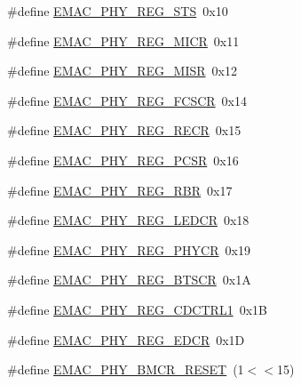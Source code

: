 \begin{DoxyCompactItemize}
\item 
\#define \hyperlink{group___e_m_a_c___private___macros_gab81231cf870148e245035dc9f08ce098}{\-E\-M\-A\-C\-\_\-\-P\-H\-Y\-\_\-\-R\-E\-G\-\_\-\-S\-T\-S}~0x10
\item 
\#define \hyperlink{group___e_m_a_c___private___macros_ga39798a05aaf30c16c250cf8f3f61a3f5}{\-E\-M\-A\-C\-\_\-\-P\-H\-Y\-\_\-\-R\-E\-G\-\_\-\-M\-I\-C\-R}~0x11
\item 
\#define \hyperlink{group___e_m_a_c___private___macros_ga61ebfc025c6ca103755e2a2ca122b3af}{\-E\-M\-A\-C\-\_\-\-P\-H\-Y\-\_\-\-R\-E\-G\-\_\-\-M\-I\-S\-R}~0x12
\item 
\#define \hyperlink{group___e_m_a_c___private___macros_gac8af2a4d386e783bab68d1c8d9c87a43}{\-E\-M\-A\-C\-\_\-\-P\-H\-Y\-\_\-\-R\-E\-G\-\_\-\-F\-C\-S\-C\-R}~0x14
\item 
\#define \hyperlink{group___e_m_a_c___private___macros_ga25d736480ebe9af3997bed2fd36e9f12}{\-E\-M\-A\-C\-\_\-\-P\-H\-Y\-\_\-\-R\-E\-G\-\_\-\-R\-E\-C\-R}~0x15
\item 
\#define \hyperlink{group___e_m_a_c___private___macros_ga4ed10e2f0eb8e71ae060fbd2d21fc312}{\-E\-M\-A\-C\-\_\-\-P\-H\-Y\-\_\-\-R\-E\-G\-\_\-\-P\-C\-S\-R}~0x16
\item 
\#define \hyperlink{group___e_m_a_c___private___macros_gac4f9ff7f137f423c364379a67cf3cb37}{\-E\-M\-A\-C\-\_\-\-P\-H\-Y\-\_\-\-R\-E\-G\-\_\-\-R\-B\-R}~0x17
\item 
\#define \hyperlink{group___e_m_a_c___private___macros_ga0703c4b7c36053d26736ae61cc87ef6a}{\-E\-M\-A\-C\-\_\-\-P\-H\-Y\-\_\-\-R\-E\-G\-\_\-\-L\-E\-D\-C\-R}~0x18
\item 
\#define \hyperlink{group___e_m_a_c___private___macros_ga3d9382ec5b61ca0931e13a8dced4f549}{\-E\-M\-A\-C\-\_\-\-P\-H\-Y\-\_\-\-R\-E\-G\-\_\-\-P\-H\-Y\-C\-R}~0x19
\item 
\#define \hyperlink{group___e_m_a_c___private___macros_gaa214d315d0302e81827d73c174e7652b}{\-E\-M\-A\-C\-\_\-\-P\-H\-Y\-\_\-\-R\-E\-G\-\_\-B\-T\-S\-C\-R}~0x1\-A
\item 
\#define \hyperlink{group___e_m_a_c___private___macros_gacdad83701075d29712d647a8d4100b78}{\-E\-M\-A\-C\-\_\-\-P\-H\-Y\-\_\-\-R\-E\-G\-\_\-\-C\-D\-C\-T\-R\-L1}~0x1\-B
\item 
\#define \hyperlink{group___e_m_a_c___private___macros_gae332489848f0ddc26aea722ca0d59d94}{\-E\-M\-A\-C\-\_\-\-P\-H\-Y\-\_\-\-R\-E\-G\-\_\-\-E\-D\-C\-R}~0x1\-D
\item 
\#define \hyperlink{group___e_m_a_c___private___macros_ga31ff2282ab7d8119471290530f1322f1}{\-E\-M\-A\-C\-\_\-\-P\-H\-Y\-\_\-\-B\-M\-C\-R\-\_\-\-R\-E\-S\-E\-T}~(1$<$$<$15)
$$
\end{DoxyCompactItemize}
